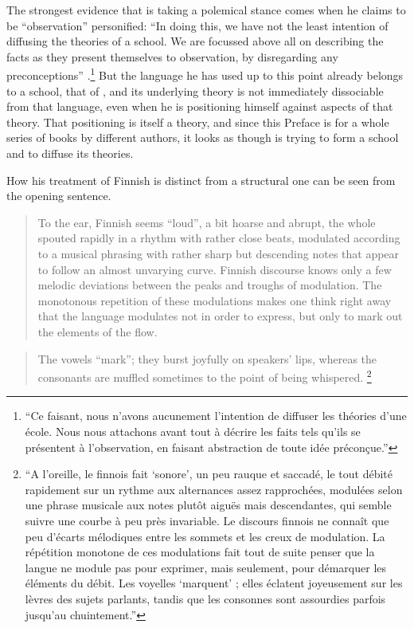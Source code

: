 \documentclass[output=paper]{langscibook}
\begin{document}
The strongest evidence that {\Sauvageot} is taking a polemical stance comes when he claims to be ``observation'' personified: ``In doing this, we have not the least intention of diffusing the theories of a school. We are focussed above all on describing the facts as they present themselves to observation, by disregarding any preconceptions'' \citep[7--8]{Sauvageot1946}.\footnote{``Ce faisant, nous n'avons aucunement l'intention de diffuser les théories d'une école. Nous nous attachons avant tout à décrire les faits tels qu'ils se présentent à l'observation, en faisant abstraction de toute idée préconçue.''} But the language he has used up to this point already belongs to a school, that of , and its underlying theory is not immediately dissociable from that language, even when he is positioning himself against aspects of that theory. That positioning is itself a theory, and since this Preface is for a whole series of books by different authors, it looks as though {\Sauvageot} is trying to form a school and to diffuse its theories.

How his treatment of Finnish is distinct from a structural one can be seen from the opening sentence. 

\begin{quotation}
To the ear, Finnish seems ``loud'', a bit hoarse and abrupt, the whole spouted rapidly in a rhythm with rather close beats, modulated according to a musical phrasing with rather sharp but descending notes that appear to follow an almost unvarying curve. Finnish discourse knows only a few melodic deviations between the peaks and troughs of modulation. The monotonous repetition of these modulations makes one think right away that the language modulates not in order to express, but only to mark out the elements of the flow.
\end{quotation}

\begin{quotation}
The vowels ``mark''; they burst joyfully on speakers' lips, whereas the consonants are muffled sometimes to the point of being whispered. \citep[15]{Sauvageot1946}\footnote{``A l'oreille, le finnois fait `sonore', un peu rauque et saccadé, le tout débité rapidement sur un rythme aux alternances assez rapprochées, modulées selon une phrase musicale aux notes plutôt aiguës mais descendantes, qui semble suivre une courbe à peu près invariable. Le discours finnois ne connaît que peu d'écarts mélodiques entre les sommets et les creux de modulation. La répétition monotone de ces modulations fait tout de suite penser que la langue ne module pas pour exprimer, mais seulement, pour démarquer les éléments du débit. Les voyelles `marquent' ; elles éclatent joyeusement sur les lèvres des sujets parlants, tandis que les consonnes sont assourdies parfois jusqu'au chuintement.''}
\end{quotation}
\end{document}
